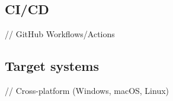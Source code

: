 
\subsection{CI/CD}\label{subsec:ci/cd}

// GitHub Workflows/Actions

\subsection{Target systems}\label{subsec:target-systems}

// Cross-platform (Windows, macOS, Linux)
